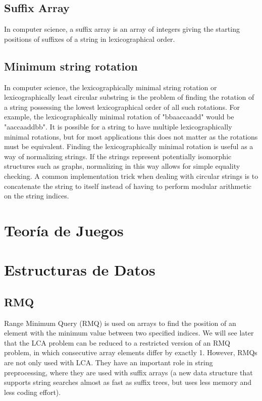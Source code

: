 \documentclass[10pt,letterpaper,twocolumn,twosided]{article}
\newcommand{\codigofuente}[1]{

\dotfill
}
\begin{document}
\codigofuente{src/string/aho.cpp}

\subsection{Suffix Array}

In computer science, a suffix array is an array of integers giving the starting positions of suffixes of a string in lexicographical order.

\codigofuente{src/string/suffix_array.cpp}

\subsection{Minimum string rotation}

In computer science, the lexicographically minimal string rotation or lexicographically least circular substring is the problem of finding the rotation of a string possessing the lowest lexicographical order of all such rotations. For example, the lexicographically minimal rotation of "bbaaccaadd" would be "aaccaaddbb". It is possible for a string to have multiple lexicographically minimal rotations, but for most applications this does not matter as the rotations must be equivalent. Finding the lexicographically minimal rotation is useful as a way of normalizing strings. If the strings represent potentially isomorphic structures such as graphs, normalizing in this way allows for simple equality checking. A common implementation trick when dealing with circular strings is to concatenate the string to itself instead of having to perform modular arithmetic on the string indices.

\codigofuente{src/string/minrot.cpp}

\section{Teoría de Juegos}

\section{Estructuras de Datos}

\subsection{RMQ}

Range Minimum Query (RMQ) is used on arrays to find the position of an element with the minimum value between two specified indices. We will see later that the LCA problem can be reduced to a restricted version of an RMQ problem, in which consecutive array elements differ by exactly 1.
However, RMQs are not only used with LCA. They have an important role in string preprocessing, where they are used with suffix arrays (a new data structure that supports string searches almost as fast as suffix trees, but uses less memory and less coding effort). 
\end{document}
